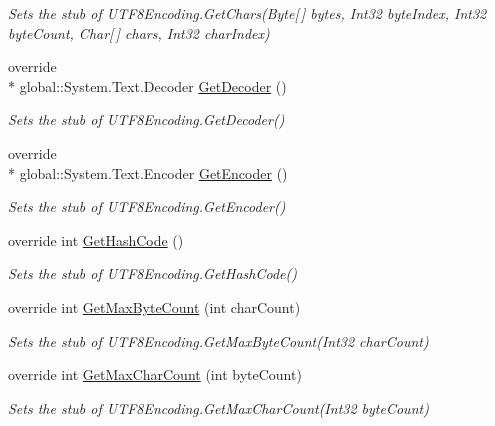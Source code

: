 \begin{DoxyCompactItemize}
\begin{DoxyCompactList}\small\item\em Sets the stub of U\-T\-F8\-Encoding.\-Get\-Chars(\-Byte\mbox{[}$\,$\mbox{]} bytes, Int32 byte\-Index, Int32 byte\-Count, Char\mbox{[}$\,$\mbox{]} chars, Int32 char\-Index)\end{DoxyCompactList}\item 
override \\*
global\-::\-System.\-Text.\-Decoder \hyperlink{class_system_1_1_text_1_1_fakes_1_1_stub_u_t_f8_encoding_a3e33e097caa9ed52d0bb8ee18bbde5e3}{Get\-Decoder} ()
\begin{DoxyCompactList}\small\item\em Sets the stub of U\-T\-F8\-Encoding.\-Get\-Decoder()\end{DoxyCompactList}\item 
override \\*
global\-::\-System.\-Text.\-Encoder \hyperlink{class_system_1_1_text_1_1_fakes_1_1_stub_u_t_f8_encoding_aaa6b18f8ef4f10bd06a57e101373ffef}{Get\-Encoder} ()
\begin{DoxyCompactList}\small\item\em Sets the stub of U\-T\-F8\-Encoding.\-Get\-Encoder()\end{DoxyCompactList}\item 
override int \hyperlink{class_system_1_1_text_1_1_fakes_1_1_stub_u_t_f8_encoding_a1443a8128035a7eb2a7dad5a90d7531c}{Get\-Hash\-Code} ()
\begin{DoxyCompactList}\small\item\em Sets the stub of U\-T\-F8\-Encoding.\-Get\-Hash\-Code()\end{DoxyCompactList}\item 
override int \hyperlink{class_system_1_1_text_1_1_fakes_1_1_stub_u_t_f8_encoding_a51d3673a30e850861848b71bb9622b0e}{Get\-Max\-Byte\-Count} (int char\-Count)
\begin{DoxyCompactList}\small\item\em Sets the stub of U\-T\-F8\-Encoding.\-Get\-Max\-Byte\-Count(\-Int32 char\-Count)\end{DoxyCompactList}\item 
override int \hyperlink{class_system_1_1_text_1_1_fakes_1_1_stub_u_t_f8_encoding_a2d8b984ed3de067c6d6a06f1510f27d8}{Get\-Max\-Char\-Count} (int byte\-Count)
\begin{DoxyCompactList}\small\item\em Sets the stub of U\-T\-F8\-Encoding.\-Get\-Max\-Char\-Count(\-Int32 byte\-Count)\end{DoxyCompactList}\item 

\end{DoxyCompactItemize}
